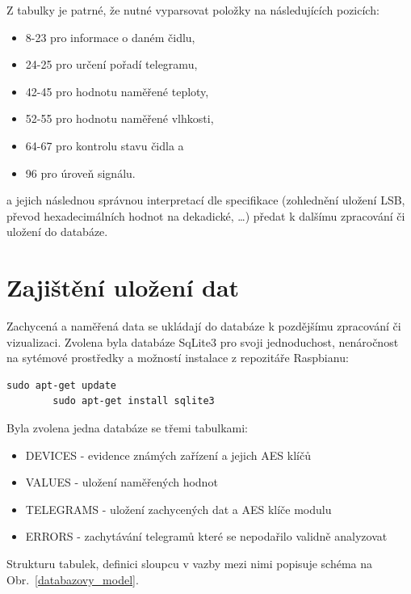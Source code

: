 Z tabulky je patrné, že nutné vyparsovat položky na následujících pozicích:
\begin{itemize}
	\item 8-23 pro informace o daném čidlu,
	\item 24-25 pro určení pořadí telegramu,
	\item 42-45 pro hodnotu naměřené teploty,
	\item 52-55 pro hodnotu naměřené vlhkosti,
	\item 64-67 pro kontrolu stavu čidla a
	\item 96 pro úroveň signálu.	
\end{itemize}

a jejich následnou správnou interpretací dle specifikace (zohlednění uložení LSB, převod hexadecimálních hodnot na dekadické, \ldots) předat k dalšímu zpracování či uložení do databáze.


\section{Zajištění uložení dat}
Zachycená a naměřená data se ukládají do databáze k pozdějšímu zpracování či vizualizaci. Zvolena byla databáze SqLite3 pro svoji jednoduchost, nenáročnost na sytémové prostředky a možností instalace z repozitáře Raspbianu:
 
\begin{lstlisting}[style=MyCodeBash]
		sudo apt-get update
		sudo apt-get install sqlite3
	\end{lstlisting}

Byla zvolena jedna databáze se třemi tabulkami:
\begin{itemize}
	\item DEVICES - evidence známých zařízení a jejich AES klíčů
	\item VALUES - uložení naměřených hodnot
	\item TELEGRAMS - uložení zachycených dat a AES klíče modulu
	\item ERRORS - zachytávání telegramů které se nepodařilo validně analyzovat
\end{itemize}

Strukturu tabulek, definici sloupcu v vazby mezi nimi popisuje schéma na Obr.~\ref{databazovy_model}.

